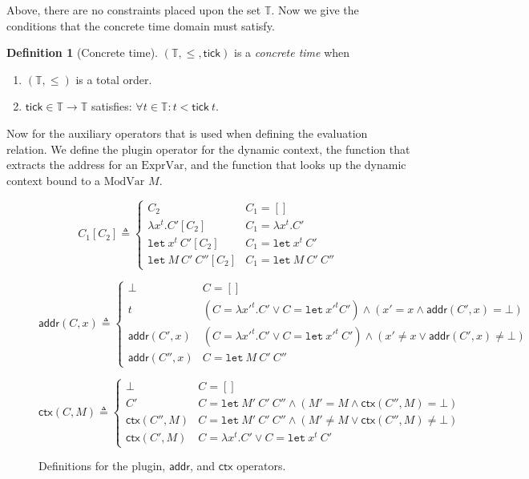 \documentclass[acmsmall,screen,review]{acmart}
\theoremstyle{definition}
\newtheorem{definition}{Definition}[section]
\newcommand*{\ExprVar}{\text{ExprVar}}
\newcommand*{\ModVar}{\text{ModVar}}
\newcommand*{\Time}{\mathbb{T}}
\newcommand*{\addr}{\mathsf{addr}}
\newcommand*{\tick}{\mathsf{tick}}
\newcommand*{\modctx}{\mathsf{ctx}}
\newcommand*{\Let}{\mathtt{let}}
\begin{document}
Above, there are no constraints placed upon the set $\Time$.
Now we give the conditions that the concrete time domain must satisfy.

\begin{definition}[Concrete time]
  $(\Time, \le, \tick)$ is a \emph{concrete time} when
  \begin{enumerate}
    \item $(\Time, \le)$ is a total order.
    \item $\tick\in\Time\rightarrow\Time$ satisfies: $\forall t\in\Time: t < \tick\:t$.
  \end{enumerate}
\end{definition}

Now for the auxiliary operators that is used when defining the evaluation relation.
We define the plugin operator for the dynamic context,
the function that extracts the address for an $\ExprVar$,
and the function that looks up the dynamic context bound to a $\ModVar$ $M$.

\begin{figure}[h!]
  \centering
  \footnotesize
  \[
    C_{1}[C_{2}]\triangleq
    \begin{cases}
      C_{2}                           & C_{1}=[]                       \\
      \lambda x^{t}.C'[C_{2}]         & C_{1}=\lambda x^{t}.C'         \\
      \mathtt{let}\:x^{t}\:C'[C_{2}]  & C_{1}=\mathtt{let}\:x^{t}\:C'  \\
      \mathtt{let}\:M\:C'\:C''[C_{2}] & C_{1}=\mathtt{let}\:M\:C'\:C''
    \end{cases}
  \]

  \[
    \addr(C,x)\triangleq
    \begin{cases}
      \bot         & C=[]                                                                                           \\
      t            & (C=\lambda x'^{t}.C'\lor C=\mathtt{let}\:x'^{t}C')\wedge (x'= x\wedge \addr(C',x)=\bot)        \\
      \addr(C',x)  & (C=\lambda x'^{t}.C'\lor C=\mathtt{let}\:x'^{t}\:C') \wedge (x'\neq x\lor \addr(C',x)\neq\bot) \\
      \addr(C'',x) & C=\mathtt{let}\:M\:C'\:C''
    \end{cases}
  \]

  \[
    \modctx(C,M)\triangleq
    \begin{cases}
      \bot           & C=[]                                                                   \\
      C'             & C=\mathtt{let}\:M'\:C'\:C''\wedge (M'= M\wedge\modctx(C'',M)=\bot)     \\
      \modctx(C'',M) & C=\mathtt{let}\:M'\:C'\:C''\wedge (M'\neq M\lor\modctx(C'',M)\neq\bot) \\
      \modctx(C',M)  & C=\lambda x^{t}.C'\lor C=\Let\:x^{t}\:C'
    \end{cases}
  \]
  \caption{Definitions for the plugin, $\addr$, and $\modctx$ operators.}
\end{figure}
\end{document}
